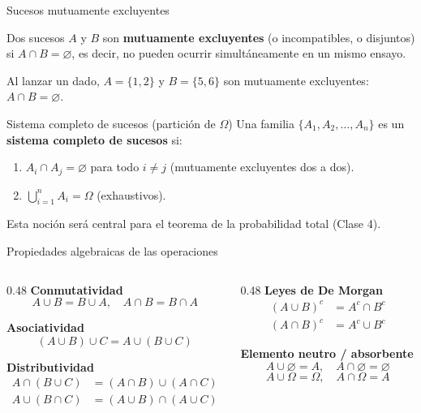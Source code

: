 \documentclass[aspectratio=169,11pt]{beamer}
\begin{document}
\begin{frame}{Sucesos mutuamente excluyentes}
\begin{definition}
Dos sucesos $A$ y $B$ son \textbf{mutuamente excluyentes} (o incompatibles, o disjuntos) si $A \cap B = \varnothing$, es decir, no pueden ocurrir simultáneamente en un mismo ensayo.
\end{definition}

\begin{example}
Al lanzar un dado, $A=\{1,2\}$ y $B=\{5,6\}$ son mutuamente excluyentes: $A \cap B = \varnothing$.
\end{example}

\begin{block}{Sistema completo de sucesos (partición de $\Omega$)}
Una familia $\{A_1,A_2,\dots,A_n\}$ es un \textbf{sistema completo de sucesos} si:
\begin{enumerate}
\item $A_i \cap A_j = \varnothing$ para todo $i \neq j$ (mutuamente excluyentes dos a dos).
\item $\displaystyle\bigcup_{i=1}^{n} A_i = \Omega$ (exhaustivos).
\end{enumerate}
Esta noción será central para el teorema de la probabilidad total (Clase 4).
\end{block}
\end{frame}

\begin{frame}{Propiedades algebraicas de las operaciones}
\begin{columns}[t]
\begin{column}{0.48\textwidth}
\textbf{Conmutatividad}
\[A\cup B = B\cup A, \quad A\cap B = B\cap A\]

\textbf{Asociatividad}
\[(A\cup B)\cup C = A\cup(B\cup C)\]

\textbf{Distributividad}
\begin{align*}
A\cap(B\cup C)&=(A\cap B)\cup(A\cap C)\\
A\cup(B\cap C)&=(A\cup B)\cap(A\cup C)
\end{align*}
\end{column}

\begin{column}{0.48\textwidth}
\textbf{Leyes de De Morgan}
\begin{align*}
(A\cup B)^c &= A^c \cap B^c\\
(A\cap B)^c &= A^c \cup B^c
\end{align*}

\textbf{Elemento neutro / absorbente}
\[A\cup \varnothing = A, \quad A\cap \varnothing = \varnothing\]
\[A\cup \Omega = \Omega, \quad A\cap \Omega = A\]
\end{column}
\end{columns}
\end{frame}
\end{document}
